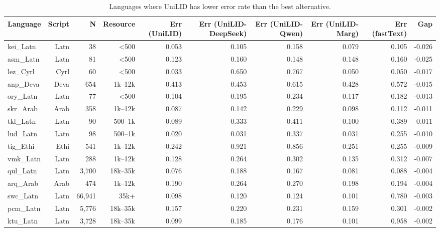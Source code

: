\begin{table}[htbp]
\centering
\small
\begin{tabular}{lrrrrrrrrr}
\toprule
\textbf{Language} & \textbf{Script} & \textbf{N} & \textbf{Resource} & \textbf{Err (UniLID)} & \textbf{Err (UniLID-DeepSeek)} & \textbf{Err (UniLID-Qwen)} & \textbf{Err (UniLID-Marg)} & \textbf{Err (fastText)} & \textbf{Gap} \\
\midrule
kei_Latn & Latn & 38 & <500 & 0.053 & 0.105 & 0.158 & 0.079 & 0.105 & -0.026 \\
asm_Latn & Latn & 81 & <500 & 0.123 & 0.160 & 0.148 & 0.148 & 0.160 & -0.025 \\
lez_Cyrl & Cyrl & 60 & <500 & 0.033 & 0.650 & 0.767 & 0.050 & 0.050 & -0.017 \\
anp_Deva & Deva & 654 & 1k--12k & 0.413 & 0.453 & 0.615 & 0.428 & 0.572 & -0.015 \\
ory_Latn & Latn & 77 & <500 & 0.104 & 0.195 & 0.234 & 0.117 & 0.182 & -0.013 \\
skr_Arab & Arab & 358 & 1k--12k & 0.087 & 0.142 & 0.229 & 0.098 & 0.112 & -0.011 \\
tkl_Latn & Latn & 90 & 500--1k & 0.089 & 0.333 & 0.411 & 0.100 & 0.389 & -0.011 \\
lud_Latn & Latn & 98 & 500--1k & 0.020 & 0.031 & 0.337 & 0.031 & 0.255 & -0.010 \\
tig_Ethi & Ethi & 541 & 1k--12k & 0.242 & 0.921 & 0.856 & 0.251 & 0.255 & -0.009 \\
vmk_Latn & Latn & 288 & 1k--12k & 0.128 & 0.264 & 0.302 & 0.135 & 0.312 & -0.007 \\
qul_Latn & Latn & 3,700 & 18k--35k & 0.076 & 0.188 & 0.167 & 0.081 & 0.088 & -0.004 \\
arq_Arab & Arab & 474 & 1k--12k & 0.190 & 0.264 & 0.270 & 0.198 & 0.194 & -0.004 \\
swc_Latn & Latn & 66,941 & 35k+ & 0.098 & 0.120 & 0.124 & 0.101 & 0.780 & -0.003 \\
pcm_Latn & Latn & 5,776 & 18k--35k & 0.157 & 0.220 & 0.231 & 0.159 & 0.301 & -0.002 \\
ktu_Latn & Latn & 3,728 & 18k--35k & 0.099 & 0.185 & 0.176 & 0.101 & 0.958 & -0.002 \\
\bottomrule
\end{tabular}
\caption{Languages where UniLID has lower error rate than the best alternative.}
\label{tab:diverge-better}
\end{table}
